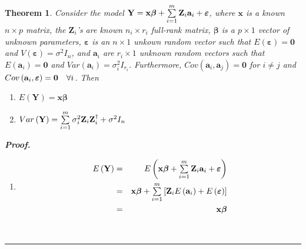 \documentclass{article}
\newtheorem{theorem}{Theorem}
\newenvironment{proof}[1][Proof]{\noindent\textbf{#1.} }{\ \rule{0.5em}{0.5em}}
\begin{document}
\bigskip

\begin{theorem}
Consider the model $\mathbf{Y}=\mathbf{x\beta }+\tsum\limits_{i=1}^{m}%
\mathbf{Z}_{i}\mathbf{a}_{i}+\mathbf{\varepsilon }$, where $\mathbf{x}$ is a
known $n\times p$ matrix, the $\mathbf{Z}_{i}$'s are known $n_{i}\times
r_{i} $ full-rank matrix, $\mathbf{\beta }$ is a $p\times 1$ vector of
unknown parameters, $\mathbf{\varepsilon }$ is an $n\times 1$ unkown random
vector such that $E\left( \mathbf{\varepsilon }\right) =\mathbf{0}$ and $%
V\left( \mathbf{\varepsilon }\right) =\sigma ^{2}I_{n}$, and $\mathbf{a}_{i}$
are $r_{i}\times 1$ unknown random vectors such that $E\left( \mathbf{a}%
_{i}\right) =\mathbf{0}$ and $Var\left( \mathbf{a}_{i}\right) =\sigma
_{i}^{2}I_{r_{i}}$. Furthermore, $Cov\left( \mathbf{a}_{i},\mathbf{a}%
_{j}\right) =\mathbf{0}$ for $i\neq j$ and $Cov\left( \mathbf{a}_{i},\mathbf{%
\varepsilon }\right) =\mathbf{0}\quad \forall i$. Then

\begin{enumerate}
\item $E\left( \mathbf{Y}\right) =\mathbf{x\beta }$

\item $Var\left( \mathbf{Y}\right) =\tsum\limits_{i=1}^{m}\sigma _{i}^{2}%
\mathbf{Z}_{i}\mathbf{Z}_{i}^{\dagger }+\sigma ^{2}I_{n}$
\end{enumerate}

\begin{proof}
\begin{enumerate}
\item 
\begin{eqnarray*}
E\left( \mathbf{Y}\right) &=&E\left( \mathbf{x\beta }+\tsum\limits_{i=1}^{m}%
\mathbf{Z}_{i}\mathbf{a}_{i}+\mathbf{\varepsilon }\right) \\
&=&\mathbf{x\beta }+\tsum\limits_{i=1}^{m}\left[ \mathbf{Z}_{i}E\left( 
\mathbf{a}_{i}\right) +E\left( \mathbf{\varepsilon }\right) \right] \\
&=&\mathbf{x\beta }
\end{eqnarray*}


\end{enumerate}
\end{proof}
\end{theorem}
\end{document}
